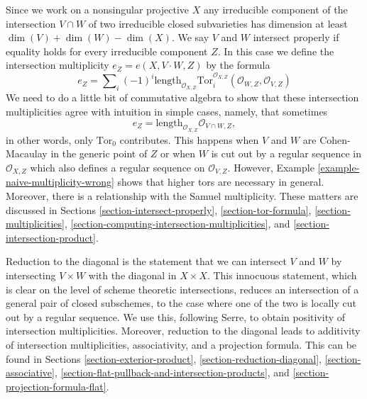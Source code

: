 \documentclass{stacks-project}
\theoremstyle{plain}
\theoremstyle{definition}
\theoremstyle{remark}
\numberwithin{equation}{subsection}
\begin{document}
\medskip\noindent
Since we work on a nonsingular projective $X$ any irreducible component
of the intersection $V \cap W$ of two irreducible closed subvarieties
has dimension at least $\dim(V) + \dim(W) - \dim(X)$. We say $V$ and $W$
intersect properly if equality holds for every irreducible component $Z$.
In this case we define the intersection multiplicity
$e_Z = e(X, V \cdot W, Z)$ by the formula
$$
e_Z = \sum\nolimits_i
(-1)^i
\text{length}_{\mathcal{O}_{X, Z}}
\text{Tor}_i^{\mathcal{O}_{X, Z}}(\mathcal{O}_{W, Z}, \mathcal{O}_{V, Z})
$$
We need to do a little bit of commutative algebra to show that these
intersection multiplicities agree with intuition in simple cases,
namely, that sometimes
$$
e_Z = \text{length}_{\mathcal{O}_{X, Z}} \mathcal{O}_{V \cap W, Z},
$$
in other words, only $\text{Tor}_0$ contributes. This happens when
$V$ and $W$ are Cohen-Macaulay in the generic point of $Z$ or when
$W$ is cut out by a regular sequence in $\mathcal{O}_{X, Z}$ which
also defines a regular sequence on $\mathcal{O}_{V, Z}$. However,
Example \ref{example-naive-multiplicity-wrong} shows that higher
tors are necessary in general. Moreover, there is a relationship
with the Samuel multiplicity. These matters are discussed in
Sections
\ref{section-intersect-properly},
\ref{section-tor-formula},
\ref{section-multiplicities},
\ref{section-computing-intersection-multiplicities}, and
\ref{section-intersection-product}. 

\medskip\noindent
Reduction to the diagonal is the statement that we can intersect
$V$ and $W$ by intersecting $V \times W$ with the diagonal in $X \times X$.
This innocuous statement, which is clear on the level of scheme
theoretic intersections, reduces an intersection of a general pair
of closed subschemes, to the case where one of the two is locally cut
out by a regular sequence. We use this, following Serre, to obtain positivity
of intersection multiplicities. Moreover, reduction to the diagonal
leads to additivity of intersection multiplicities, associativity, and a
projection formula. This can be found in Sections
\ref{section-exterior-product},
\ref{section-reduction-diagonal},
\ref{section-associative},
\ref{section-flat-pullback-and-intersection-products}, and
\ref{section-projection-formula-flat}.
\end{document}
